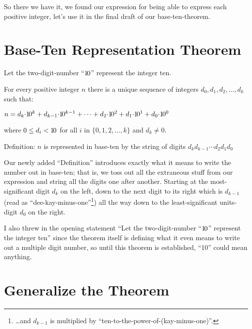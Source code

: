 \documentclass{article}
\newenvironment{jprIn}{\begin{adjustwidth}{2em}{}}{\end{adjustwidth}}
\begin{document}
So there we have it, we found our expression for being able to
express each positive integer, let's use
it in the final draft of our base-ten-theorem.

\section*{Base-Ten Representation Theorem}
\begin{jprIn}
Let the two-digit-number ``${1\hspace{-0.12em}0}$'' represent the integer ten.

For every positive integer $n$ there is a unique
sequence of integers $d_0, d_1, d_2,\dots{},d_k$ such that:

\hspace{3em}$n
=d_k{\cdot}{1\hspace{-0.12em}0}^k
+d_{k-1}{\cdot}{1\hspace{-0.12em}0}^{k-1}
+\dots
+d_2{\cdot}{1\hspace{-0.12em}0}^2
+d_1{\cdot}{1\hspace{-0.12em}0}^1
+d_0{\cdot}{1\hspace{-0.12em}0}^0$

where $0\le{}d_i<{1\hspace{-0.12em}0}$ for all $i$ in $\{0,1,2,\dots{},k\}$ and $d_k\ne0$.

Definition: $n$ is represented in base-ten by the string of digits $d_kd_{k-1}{\cdots}d_2d_1d_0$
\end{jprIn}

Our newly added ``Definition'' introduces exactly what it means to write
the number out in base-ten; that is,
we toss out all the extraneous stuff from our expression
and string all the digits one after another.
Starting at the most-significant digit $d_k$ on the left,
down to the next digit to its right which is $d_{k-1}$
(read as ``dee-kay-minus-one''\footnote{\dots{}and $d_{k-1}$ is
multiplied by ``ten-to-the-power-of-(kay-minus-one)''.})
all the way down to the least-significant units-digit $d_0$ on the right.

I also threw in the opening statement
``Let the two-digit-number ``${1\hspace{-0.12em}0}$'' represent the integer ten''
since the theorem itself is defining what it even means to write out
a multiple digit number, so until this theorem is established, ``10'' could
mean anything.

\section*{Generalize the Theorem}
\end{document}
